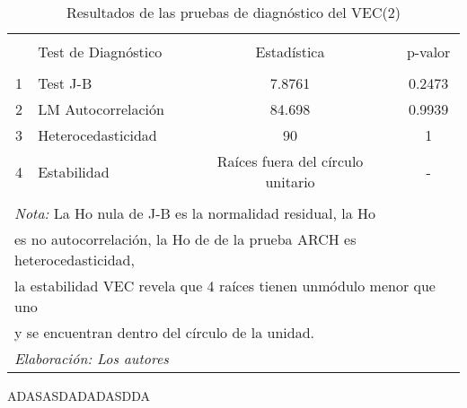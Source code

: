 \documentclass[11pt,]{article}
\begin{document}
\begin{table}[!htbp] \centering 
  \caption{Resultados de las pruebas de diagnóstico del VEC(2)} 
  \label{tab:tb5} 
\small 
\begin{tabular}{@{\extracolsep{5pt}} clcc} 
\\[-1.8ex]\hline 
\hline \\[-1.8ex] 
 & Test de Diagnóstico & Estadística & p-valor \\ 
\hline \\[-1.8ex] 
1 & Test J-B & 7.8761 & 0.2473 \\ 
2 & LM Autocorrelación & 84.698 & 0.9939 \\ 
3 & Heterocedasticidad & 90 & 1 \\ 
4 & Estabilidad & Raíces fuera del círculo unitario & - \\ 
\hline \\[-1.8ex] 
\multicolumn{4}{l}{\footnotesize{\textit{Nota:} La Ho nula de J-B es la normalidad residual, la Ho }} \\ 
\multicolumn{4}{l}{ \footnotesize{es no autocorrelación, la Ho de de la prueba ARCH es heterocedasticidad,}} \\ 
\multicolumn{4}{l}{ \footnotesize{la estabilidad VEC revela que 4 raíces tienen unmódulo menor que uno}} \\ 
\multicolumn{4}{l}{\footnotesize{y se encuentran dentro del círculo de la unidad.}} \\ 
\multicolumn{4}{l}{\footnotesize{\textit{Elaboración: Los autores}}} \\ 
\end{tabular} 
\end{table}

ADASASDADADASDDA
\end{document}
